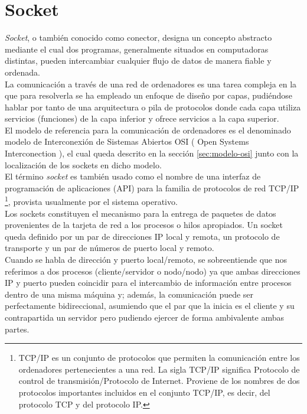 \section{Socket}
\label{sec:def-socket}

\emph{Socket}, o también conocido como conector, designa un concepto abstracto mediante el cual dos programas, generalmente situados en computadoras distintas, pueden intercambiar cualquier flujo de datos
de manera fiable y ordenada.\\

La comunicación a través de una red de ordenadores es una tarea compleja en la que para resolverla se ha empleado un enfoque de diseño por capas, pudiéndose hablar por tanto de una arquitectura 
o pila de protocolos donde cada capa utiliza servicios (funciones) de la capa inferior y ofrece servicios a la capa superior. \\

El modelo de referencia para la comunicación de ordenadores es el denominado modelo de Interconexión de Sistemas Abiertos OSI ( Open Systems Interconection ), el cual queda descrito
en la sección \ref{sec:modelo-osi} junto con la localización de los sockets en dicho modelo.\\

El término \emph{socket} es también usado como el nombre de una interfaz de programación de aplicaciones (API) para la familia de protocolos de red TCP/IP \footnote{ TCP/IP es un conjunto de protocolos que
permiten la comunicación entre los ordenadores pertenecientes a una red. La sigla TCP/IP significa Protocolo de control de transmisión/Protocolo de Internet. Proviene de los nombres de dos protocolos 
importantes incluidos en el conjunto TCP/IP, es decir, del protocolo TCP y del protocolo IP. }, provista usualmente por el sistema operativo.\\

Los sockets constituyen el mecanismo para la entrega de paquetes de datos provenientes de la tarjeta de red a los procesos o hilos apropiados. Un socket queda definido por un par de direcciones IP local
y remota, un protocolo de transporte y un par de números de puerto local y remoto.\\

Cuando se habla de dirección y puerto local/remoto, se sobreentiende que nos referimos a dos procesos (cliente/servidor o nodo/nodo) ya que ambas direcciones IP y puerto pueden coincidir para el intercambio de información entre procesos dentro de una misma máquina
y; además, la comunicación puede ser perfectamente bidireccional, asumiendo que el par que la inicia es el cliente y su contrapartida un servidor pero pudiendo ejercer de forma ambivalente ambas partes.\\


